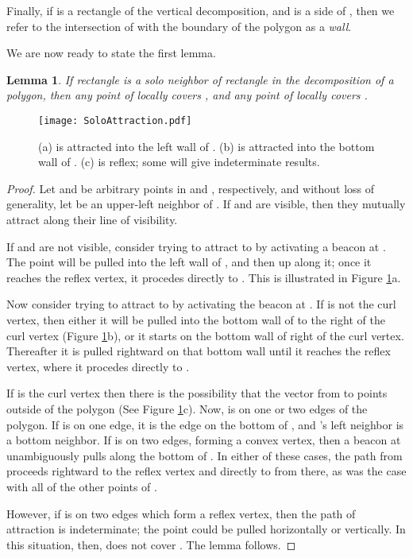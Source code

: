 \documentclass{article}
\newtheorem{lemma}{Lemma}
\begin{document}
		
		Finally, if  is a rectangle of the vertical decomposition, and  is a
		side of , then we refer to the intersection of  with the boundary of the polygon as
		a \emph{wall}.
	
	We are now ready to state the first lemma.
	
	\begin{lemma}\label{lem:solocovered}
		If rectangle  is a solo neighbor of rectangle  in the decomposition of
		a polygon, then any point of  locally covers , and any point of 
		locally covers .
	\end{lemma}
	
	\begin{figure}[htbp] 
		\begin{center}
		    \texttt{[image: SoloAttraction.pdf]} 
		\end{center}
		\caption{
			(a)  is attracted into the left wall of .
			(b)  is attracted into the bottom wall of .
			(c)  is reflex; some  will give indeterminate results.
		}
		\label{fig:soloattraction}
	\end{figure}
	
	\begin{proof}
		Let  and  be arbitrary points in  and , respectively, and without
		loss of generality, let  be an upper-left neighbor of .
		If  and  are visible, then they mutually attract along their line of
		visibility.
		  
		If  and  are not visible, consider trying to attract  to  by
		activating a beacon at .
		The point will be pulled into the left wall of , and then up along it; once
		it reaches the reflex vertex, it procedes directly to .
		This is illustrated in Figure \ref{fig:soloattraction}a.
		
		Now consider trying to attract  to  by activating the beacon at .
		If  is not the curl vertex, then either it will be pulled into the bottom
		wall of  to the right of the curl vertex (Figure
		\ref{fig:soloattraction}b), or it starts on the bottom wall of  right of
		the curl vertex.  Thereafter it is pulled rightward on that bottom wall until
		it reaches the reflex vertex, where it procedes directly to .
		
		If  is the curl vertex then there is
		the possibility that the vector from  to  points outside of the
		polygon (See Figure \ref{fig:soloattraction}c).  
		Now,  is on one or two edges of the polygon.
		If  is on one edge, it is the edge on the bottom of , and 's left
		neighbor is a bottom neighbor.
		If  is on two edges, forming a convex vertex, then a beacon at 
		unambiguously pulls  along the bottom of .
		In either of these cases, the path from  proceeds rightward to
		the reflex vertex and directly to  from there, as was the case with
		all of the other points of .
		
		However, if  is on two edges which form a reflex vertex,
		then the path of attraction is indeterminate; the point could be
		pulled horizontally or vertically.
		In this situation, then,  does not cover .  The lemma follows.
	\end{proof}
	
\end{document}
